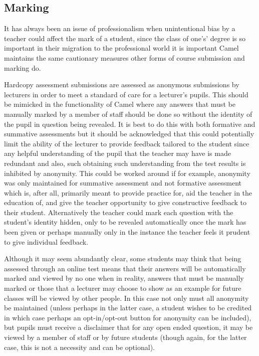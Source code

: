     \subsection*{Marking}
    It has always been an issue of professionalism when unintentional bias by a teacher could affect the mark of a student, since the class of one's’ degree is so important in their migration to the professional world it is important Camel maintains the same cautionary measures other forms of course submission and marking do.

    Hardcopy assessment submissions are assessed as anonymous submissions by lecturers in order to meet a standard of care for a lecturer’s pupils. This should be mimicked in the functionality of Camel where any answers that must be manually marked by a member of staff should be done so without the identity of the pupil in question being revealed. It is best to do this with both formative and summative assessments but it should be acknowledged that this could potentially limit the ability of the lecturer to provide feedback tailored to the student since any helpful understanding of the pupil that the teacher may have is made redundant and also, such obtaining such understanding from the test results is inhibited by anonymity. This could be worked around if for example, anonymity was only maintained for summative assessment and not formative assessment which is, after all, primarily meant to provide practice for, aid the teacher in the education of, and give the teacher opportunity to give constructive feedback to their student. Alternatively the teacher could mark each question with the student’s identity hidden, only to be revealed automatically once the mark has been given or perhaps manually only in the instance the teacher feels it prudent to give individual feedback.

    Although it may seem abundantly clear, some students may think that being assessed through an online test means that their answers will be automatically marked and viewed by no one when in reality, answers that must be manually marked or those that a lecturer may choose to show as an example for future classes will be viewed by other people. In this case not only must all anonymity be maintained (unless perhaps in the latter case, a student wishes to be credited in which case perhaps an opt-in/opt-out button for anonymity can be included), but pupils must receive a disclaimer that for any open ended question, it may be viewed by a member of staff or by future students (though again, for the latter case, this is not a necessity and can be optional).

